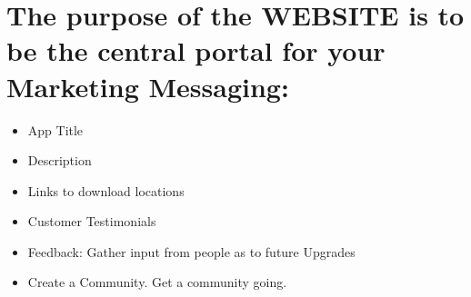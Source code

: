 \section{The purpose of the WEBSITE is to be the central portal for your Marketing Messaging:}


\begin{itemize}
    \item App Title
    \item Description
    \item Links to download locations
    \item Customer Testimonials
    \item Feedback: Gather input from people as to future Upgrades
    \item Create a Community. Get a community going.
\end{itemize}